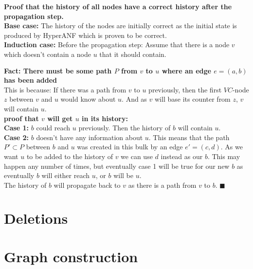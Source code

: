 \noindent\textbf{Proof that the history of all nodes have a correct history after the propagation step.}\\

\noindent\textbf{Base case:} The history of the nodes are initially correct as the initial state is produced by HyperANF which is proven to be correct. \\

\noindent\textbf{Induction case:} Before the propagation step: Assume that there is a node $v$ which doesn't contain a node $u$ that it should contain. \\

\begin{addmargin}[2em]{0em}
    \noindent\textbf{Fact: There must be some path $P$ from $v$ to $u$ where an edge $e = (a,b)$ has been added}\\ 
    This is because: If there was a path from $v$ to $u$ previously, then the first $VC$-node $z$ between $v$ and $u$ would know about $u$. And as $v$ will base its counter from $z$, $v$ will contain $u$.\\
    
    \noindent\textbf{proof that $v$ will get $u$ in its history:}\\
    
    \noindent\textbf{Case 1:} 
    $b$ could reach $u$ previously. Then the history of $b$ will contain $u$.\\
    
    \noindent\textbf{Case 2:}
    $b$ doesn't have any information about $u$. This means that the path $P' \subset P$ between $b$ and $u$ was created in this bulk by an edge $e'=(c,d)$. As we want $u$ to be added to the history of $v$ we can use $d$ instead as our $b$. This may happen any number of times, but eventually case 1 will be true for our new $b$ as eventually $b$ will either reach $u$, or $b$ will be $u$.\\
    
    \noindent The history of $b$ will propagate back to $v$ as there is a path from $v$ to $b$. $\blacksquare$
\end{addmargin}



\section{Deletions}

\section{Graph construction}

